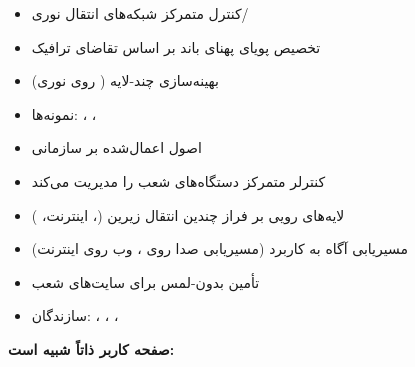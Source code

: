 




\CNchained{}

\begin{itemize}
\tightlist
\item
  کنترل متمرکز شبکه‌های انتقال نوری/\allowbreak{}
\item
  تخصیص پویای پهنای باند بر اساس تقاضای ترافیک
\item
  بهینه‌سازی چند-لایه ( روی نوری)
\item
  نمونه‌ها: ، ، 
\end{itemize}


\begin{itemize}
\tightlist
\item
  اصول  اعمال‌شده بر  سازمانی
\item
  کنترلر متمرکز دستگاه‌های  شعب را مدیریت می‌کند
\item
  لایه‌های رویی بر فراز چندین انتقال زیرین (، اینترنت، )
\item
  مسیریابی آگاه به کاربرد (مسیریابی صدا روی ، وب روی اینترنت)
\item
  تأمین بدون-لمس برای سایت‌های شعب
\item
  سازندگان: ، ، ، 
\end{itemize}





\textbf{صفحه کاربر  ذاتاً شبیه  است:}

